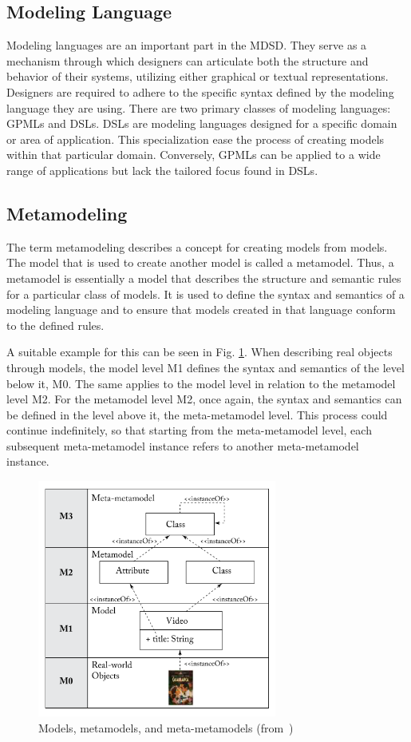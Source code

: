 \subsection{Modeling Language}
Modeling languages are an important part in the MDSD. They serve as a mechanism through which designers can articulate both the structure and behavior of their systems, utilizing either graphical or textual representations. Designers are required to adhere to the specific syntax defined by the modeling language they are using. There are two primary classes of modeling languages: GPMLs and DSLs. DSLs are modeling languages designed for a specific domain or area of application. This specialization ease the process of creating models within that particular domain. Conversely, GPMLs can be applied to a wide range of applications but lack the tailored focus found in DSLs.~\cite{Brambilla.2017}

\subsection{Metamodeling}
The term metamodeling describes a concept for creating models from models. The model that is used to create another model is called a metamodel. Thus, a metamodel is essentially a model that describes the structure and semantic rules for a particular class of models. It is used to define the syntax and semantics of a modeling language and to ensure that models created in that language conform to the defined rules. 

A suitable example for this can be seen in Fig. \ref{fig:Meta-Modeling}. When describing real objects through models, the model level M1 defines the syntax and semantics of the level below it, M0. The same applies to the model level in relation to the metamodel level M2. For the metamodel level M2, once again, the syntax and semantics can be defined in the level above it, the meta-metamodel level. This process could continue indefinitely, so that starting from the meta-metamodel level, each subsequent meta-metamodel instance refers to another meta-metamodel instance.~\cite{Brambilla.2017}
\begin{figure}[h!]
\centering
\includegraphics[width=0.7\textwidth]{bilder/Meta-Modeling.png}
\caption{Models, metamodels, and meta-metamodels (from~\cite{Brambilla.2017})}
\label{fig:Meta-Modeling}
\end{figure} 

